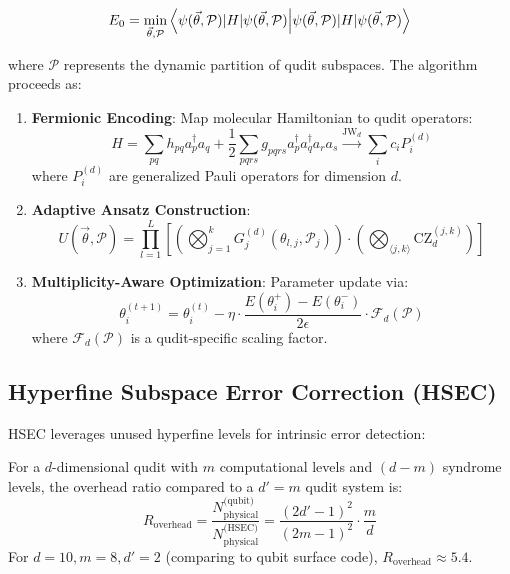 \documentclass[12pt, a4paper]{article}
\begin{document}
\begin{equation}
E_0 = \min_{\vec{\theta}, \mathcal{P}} \braket{\psi(\vec{\theta}, \mathcal{P}) | H | \psi(\vec{\theta}, \mathcal{P})}
\end{equation}

where $\mathcal{P}$ represents the dynamic partition of qudit subspaces. The algorithm proceeds as:

\begin{enumerate}
    \item \textbf{Fermionic Encoding}: Map molecular Hamiltonian to qudit operators:
    \begin{equation}
    H = \sum_{pq} h_{pq} a_p^\dagger a_q + \frac{1}{2} \sum_{pqrs} g_{pqrs} a_p^\dagger a_q^\dagger a_r a_s \xrightarrow{\text{JW}_d} \sum_{i} c_i P_i^{(d)}
    \end{equation}
    where $P_i^{(d)}$ are generalized Pauli operators for dimension $d$.
    
    \item \textbf{Adaptive Ansatz Construction}:
    \begin{equation}
    U(\vec{\theta}, \mathcal{P}) = \prod_{l=1}^{L} \left[ \left( \bigotimes_{j=1}^{k} G_j^{(d)}(\theta_{l,j}, \mathcal{P}_j) \right) \cdot \left( \bigotimes_{\langle j,k \rangle} \text{CZ}_d^{(j,k)} \right) \right]
    \end{equation}
    
    \item \textbf{Multiplicity-Aware Optimization}: Parameter update via:
    \begin{equation}
    \theta_{i}^{(t+1)} = \theta_{i}^{(t)} - \eta \cdot \frac{E(\theta_i^+) - E(\theta_i^-)}{2\epsilon} \cdot \mathcal{F}_d(\mathcal{P})
    \end{equation}
    where $\mathcal{F}_d(\mathcal{P})$ is a qudit-specific scaling factor.
\end{enumerate}

\subsection{Hyperfine Subspace Error Correction (HSEC)}
HSEC leverages unused hyperfine levels for intrinsic error detection:

\begin{theorem}
For a $d$-dimensional qudit with $m$ computational levels and $(d-m)$ syndrome levels, the overhead ratio compared to a $d'=m$ qudit system is:
\begin{equation}
R_{\text{overhead}} = \frac{N_{\text{physical}}^{\text{(qubit)}}}{N_{\text{physical}}^{\text{(HSEC)}}} = \frac{(2d'-1)^2}{(2m-1)^2} \cdot \frac{m}{d}
\end{equation}
For $d=10, m=8, d'=2$ (comparing to qubit surface code), $R_{\text{overhead}} \approx 5.4$.
\end{theorem}
\end{document}

